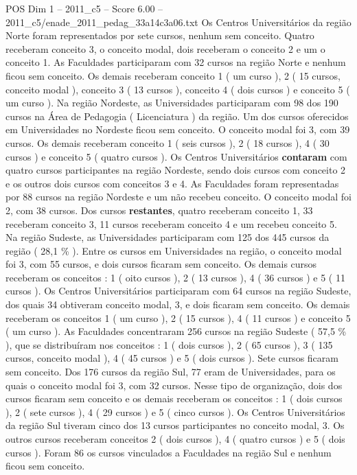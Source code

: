 \begin{textsample}{POS Dim 1 – 2011\_c5 – Score 6.00 – 2011\_c5/enade\_2011\_pedag\_33a14c3a06.txt}
Os Centros Universitários da região Norte foram representados por sete cursos, nenhum sem conceito.
Quatro receberam conceito 3, o conceito modal, dois receberam o conceito 2 e um o conceito 1.
As Faculdades participaram com 32 cursos na região Norte e nenhum ficou sem conceito.
Os demais receberam conceito 1 ( um curso ), 2 ( 15 cursos, conceito modal ), conceito 3 ( 13 cursos ), conceito 4 ( dois cursos ) e conceito 5 ( um curso ).
Na região Nordeste, as Universidades participaram com 98 dos 190 cursos na Área de Pedagogia ( Licenciatura ) da região.
Um dos cursos oferecidos em Universidades no Nordeste ficou sem conceito.
O conceito modal foi 3, com 39 cursos.
Os demais receberam conceito 1 ( seis cursos ), 2 ( 18 cursos ), 4 ( 30 cursos ) e conceito 5 ( quatro cursos ).
Os Centros Universitários \textbf{contaram} com quatro cursos participantes na região Nordeste, sendo dois cursos com conceito 2 e os outros dois cursos com conceitos 3 e 4.
As Faculdades foram representadas por 88 cursos na região Nordeste e um não recebeu conceito.
O conceito modal foi 2, com 38 cursos.
Dos cursos \textbf{restantes}, quatro receberam conceito 1, 33 receberam conceito 3, 11 cursos receberam conceito 4 e um recebeu conceito 5.
Na região Sudeste, as Universidades participaram com 125 dos 445 cursos da região ( 28,1 \% ).
Entre os cursos em Universidades na região, o conceito modal foi 3, com 55 cursos, e dois cursos ficaram sem conceito.
Os demais cursos receberam os conceitos : 1 ( oito cursos ), 2 ( 13 cursos ), 4 ( 36 cursos ) e 5 ( 11 cursos ).
Os Centros Universitários participaram com 64 cursos na região Sudeste, dos quais 34 obtiveram conceito modal, 3, e dois ficaram sem conceito.
Os demais receberam os conceitos 1 ( um curso ), 2 ( 15 cursos ), 4 ( 11 cursos ) e conceito 5 ( um curso ).
As Faculdades concentraram 256 cursos na região Sudeste ( 57,5 \% ), que se distribuíram nos conceitos : 1 ( dois cursos ), 2 ( 65 cursos ), 3 ( 135 cursos, conceito modal ), 4 ( 45 cursos ) e 5 ( dois cursos ).
Sete cursos ficaram sem conceito.
Dos 176 cursos da região Sul, 77 eram de Universidades, para os quais o conceito modal foi 3, com 32 cursos.
Nesse tipo de organização, dois dos cursos ficaram sem conceito e os demais receberam os conceitos : 1 ( dois cursos ), 2 ( sete cursos ), 4 ( 29 cursos ) e 5 ( cinco cursos ).
Os Centros Universitários da região Sul tiveram cinco dos 13 cursos participantes no conceito modal, 3.
Os outros cursos receberam conceitos 2 ( dois cursos ), 4 ( quatro cursos ) e 5 ( dois cursos ).
Foram 86 os cursos vinculados a Faculdades na região Sul e nenhum ficou sem conceito.

\end{textsample}
